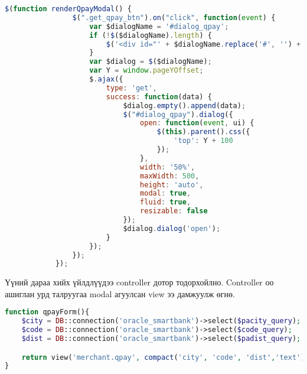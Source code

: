\begin{lstlisting}[language=Javascript, caption=JQuery Ajax ашиглан controller луугаа өгөгдөлүүдээ шидэх, frame=single]
	$(function renderQpayModal() {
                $(".get_qpay_btn").on("click", function(event) {
                    var $dialogName = '#dialog_qpay';
                    if (!$($dialogName).length) {
                        $('<div id="' + $dialogName.replace('#', '') + '"></div>').appendTo('body');
                    }
                    var $dialog = $($dialogName);
                    var Y = window.pageYOffset;
                    $.ajax({
                        type: 'get',
                        success: function(data) {
                            $dialog.empty().append(data);
                            $("#dialog_qpay").dialog({
                                open: function(event, ui) {
                                    $(this).parent().css({
                                        'top': Y + 100
                                    });
                                },
                                width: '50%',
                                maxWidth: 500,
                                height: 'auto',
                                modal: true,
                                fluid: true,
                                resizable: false
                            });
                            $dialog.dialog('open');
                        }
                    });
                });
            });
\end{lstlisting}

Үүний дараа хийх үйлдлүүдээ controller дотор тодорхойлно. Controller оо ашиглан урд талруугаа modal агуулсан view ээ дамжуулж өгнө.

\begin{lstlisting}[language=php, caption=Хийх үйлдлүүдийг тодорхойлох, frame=single]
function qpayForm(){
    $city = DB::connection('oracle_smartbank')->select($pacity_query);
    $code = DB::connection('oracle_smartbank')->select($code_query);
    $dist = DB::connection('oracle_smartbank')->select($padist_query);

    return view('merchant.qpay', compact('city', 'code', 'dist','text'));
}
\end{lstlisting}


